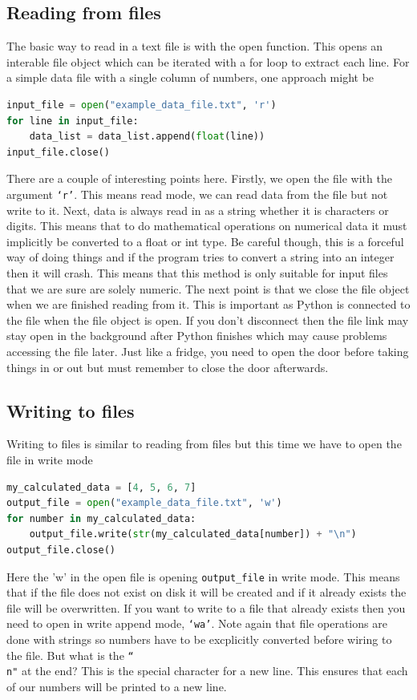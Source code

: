	\subsection{Reading from files}
		The basic way to read in a text file is with the open function. This opens an interable file object which can be iterated with a for loop to extract each line. For a simple data file with a single column of numbers, one approach might be
		\begin{lstlisting}[language=Python]
input_file = open("example_data_file.txt", 'r')
for line in input_file:
	data_list = data_list.append(float(line))
input_file.close()
\end{lstlisting}	
		There are a couple of interesting points here. Firstly, we open the file with the argument \texttt{`r'}. This means read mode, we can read data from the file but not write to it.
Next, data is always read in as a string whether it is characters or digits. This means that to do mathematical operations on numerical data it must implicitly be converted to a float or int type. Be careful though, this is a forceful way of doing things and if the program tries to convert a string into an integer then it will crash. This means that this method is only suitable for input files that we are sure are solely numeric.
		The next point is that we close the file object when we are finished reading from it. This is important as Python is connected to the file when the file object is open. If you don't disconnect then the file link may stay open in the background after Python finishes which may cause problems accessing the file later. Just like a fridge, you need to open the door before taking things in or out but must remember to close the door afterwards.

	\subsection{Writing to files}
		Writing to files is similar to reading from files but this time we have to open the file in write mode
		\begin{lstlisting}[language=Python]
my_calculated_data = [4, 5, 6, 7]
output_file = open("example_data_file.txt", 'w')
for number in my_calculated_data:
	output_file.write(str(my_calculated_data[number]) + "\n")
output_file.close()
\end{lstlisting}	
	Here the 'w' in the open file is opening \texttt{output\_file} in write mode. This means that if the file does not exist on disk it will be created and if it already exists the file will be overwritten. If you want to write to a file that already exists then you need to open in write append mode, \texttt{`wa'}.
Note again that file operations are done with strings so numbers have to be excplicitly converted before wiring to the file. But what is the \texttt{``\\n"} at the end? This is the special character for a new line. This ensures that each of our numbers will be printed to a new line.


